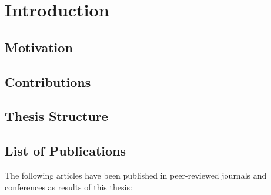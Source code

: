 
\chapter{Introduction} %
\label{cha:introduction}
%
\section{Motivation} %
\label{sec:motivation}

%
\section{Contributions} %
\label{sec:contributions}

%
\section{Thesis Structure} %
\label{sec:thesis_structure}

%
\clearpage
\section{List of Publications} %
\label{sec:list_of_publications}
%
The following articles have been published in peer-reviewed journals and
conferences as results of this thesis:
%
%

